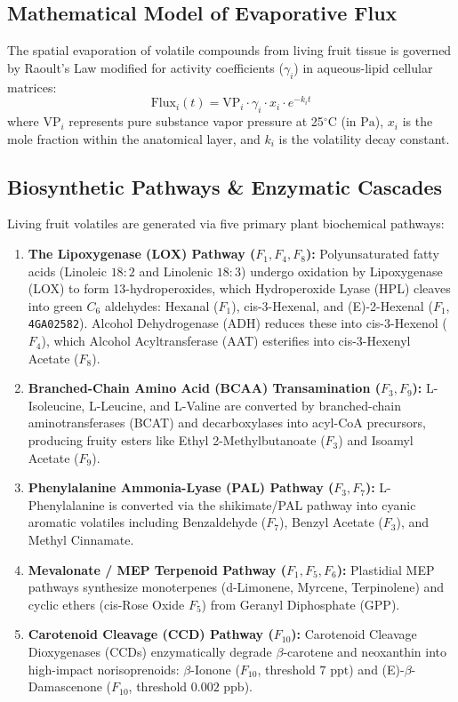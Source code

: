 \documentclass[11pt,a4paper]{article}
\begin{document}
\subsection{Mathematical Model of Evaporative Flux}
The spatial evaporation of volatile compounds from living fruit tissue is governed by Raoult's Law modified for activity coefficients ($\gamma_i$) in aqueous-lipid cellular matrices:
\begin{equation}
    \text{Flux}_i(t) = \text{VP}_i \cdot \gamma_i \cdot x_i \cdot e^{-k_i t}
\end{equation}
where $\text{VP}_i$ represents pure substance vapor pressure at 25$^\circ$C (in $\text{Pa}$), $x_i$ is the mole fraction within the anatomical layer, and $k_i$ is the volatility decay constant.

\subsection{Biosynthetic Pathways \& Enzymatic Cascades}
Living fruit volatiles are generated via five primary plant biochemical pathways:
\begin{enumerate}[leftmargin=1.5em]
    \item \textbf{The Lipoxygenase (LOX) Pathway ($F_1, F_4, F_8$):} Polyunsaturated fatty acids (Linoleic $18:2$ and Linolenic $18:3$) undergo oxidation by Lipoxygenase (LOX) to form 13-hydroperoxides, which Hydroperoxide Lyase (HPL) cleaves into green $C_6$ aldehydes: Hexanal ($F_1$), cis-3-Hexenal, and (E)-2-Hexenal ($F_1$, \texttt{4GA02582}). Alcohol Dehydrogenase (ADH) reduces these into cis-3-Hexenol ($F_4$), which Alcohol Acyltransferase (AAT) esterifies into cis-3-Hexenyl Acetate ($F_8$).
    \item \textbf{Branched-Chain Amino Acid (BCAA) Transamination ($F_3, F_9$):} L-Isoleucine, L-Leucine, and L-Valine are converted by branched-chain aminotransferases (BCAT) and decarboxylases into acyl-CoA precursors, producing fruity esters like Ethyl 2-Methylbutanoate ($F_3$) and Isoamyl Acetate ($F_9$).
    \item \textbf{Phenylalanine Ammonia-Lyase (PAL) Pathway ($F_3, F_7$):} L-Phenylalanine is converted via the shikimate/PAL pathway into cyanic aromatic volatiles including Benzaldehyde ($F_7$), Benzyl Acetate ($F_3$), and Methyl Cinnamate.
    \item \textbf{Mevalonate / MEP Terpenoid Pathway ($F_1, F_5, F_6$):} Plastidial MEP pathways synthesize monoterpenes (d-Limonene, Myrcene, Terpinolene) and cyclic ethers (cis-Rose Oxide $F_5$) from Geranyl Diphosphate (GPP).
    \item \textbf{Carotenoid Cleavage (CCD) Pathway ($F_{10}$):} Carotenoid Cleavage Dioxygenases (CCDs) enzymatically degrade $\beta$-carotene and neoxanthin into high-impact norisoprenoids: $\beta$-Ionone ($F_{10}$, threshold $7\text{ ppt}$) and (E)-$\beta$-Damascenone ($F_{10}$, threshold $0.002\text{ ppb}$).
\end{enumerate}
\end{document}
